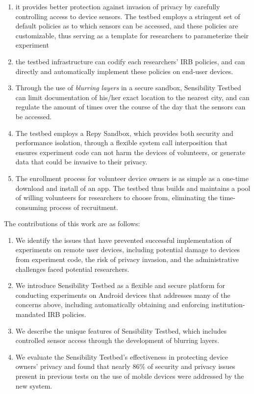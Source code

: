 \begin{enumerate}
\item  it provides better protection against invasion of privacy by carefully controlling
access to device sensors. The testbed employs a stringent set of
default policies as to which sensors can be accessed, and these
policies are customizable, thus serving as a template for researchers
to parameterize their experiment

\item   the testbed infrastructure can codify each researchers' IRB policies, and can
directly and automatically implement these policies on end-user
devices. 

\item  Through the use of \textit{blurring layers} in a secure
sandbox, Sensibility Testbed can limit documentation of his/her exact
location to the nearest city, and can regulate the amount of times
over the course of the day that the sensors can be accessed.

\item The testbed employs a Repy Sandbox, which provides both security and performance isolation,
through a flexible system call interposition that ensures experiment code can not harm the
devices of volunteers, or generate data that could be invasive to
their privacy.

\item  The enrollment process for volunteer device owners is as
simple as a one-time download and install of an app. The testbed thus
builds and maintains a pool of willing volunteers for researchers to
choose from, eliminating the time-consuming process of recruitment.
\end{enumerate}

The contributions of this work are as follows:

\begin{enumerate}
\item We identify the issues that have prevented successful implementation
of experiments on remote user devices, including potential damage to
devices from experiment code, the risk of privacy invasion, and the
administrative challenges faced potential researchers.

\item We introduce Sensibility Testbed as a flexible and secure platform for
conducting experiments on Android devices that addresses many of the
concerns above, including automatically obtaining and enforcing institution-mandated IRB policies.

\item We describe the unique features of Sensibility Testbed, which includes controlled sensor access through the
development of blurring layers.

\item We evaluate the Sensibility Testbed's effectiveness in
protecting device owners' privacy and found that nearly 86\% of
security and privacy issues present in previous tests on the use of
mobile devices were addressed by the new system.
\end{enumerate}

